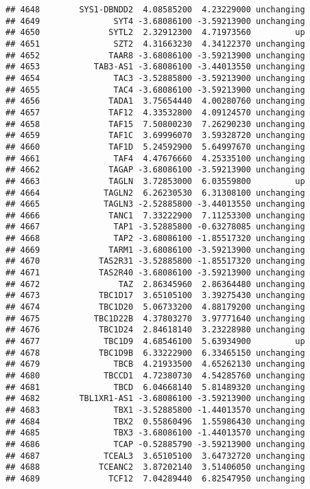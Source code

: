 \documentclass[]{article}
\begin{document}
\begin{verbatim}
## 4648        SYS1-DBNDD2  4.08585200  4.23229000 unchanging
## 4649               SYT4 -3.68086100 -3.59213900 unchanging
## 4650              SYTL2  2.32912300  4.71973560         up
## 4651               SZT2  4.31663230  4.34122370 unchanging
## 4652              TAAR8 -3.68086100 -3.59213900 unchanging
## 4653           TAB3-AS1 -3.68086100 -3.44013550 unchanging
## 4654               TAC3 -3.52885800 -3.59213900 unchanging
## 4655               TAC4 -3.68086100 -3.59213900 unchanging
## 4656              TADA1  3.75654440  4.00280760 unchanging
## 4657              TAF12  4.33532800  4.09124570 unchanging
## 4658              TAF15  7.50800230  7.26290230 unchanging
## 4659              TAF1C  3.69996070  3.59328720 unchanging
## 4660              TAF1D  5.24592900  5.64997670 unchanging
## 4661               TAF4  4.47676660  4.25335100 unchanging
## 4662              TAGAP -3.68086100 -3.59213900 unchanging
## 4663              TAGLN  3.72853000  6.03559800         up
## 4664             TAGLN2  6.26230530  6.31308100 unchanging
## 4665             TAGLN3 -2.52885800 -3.44013550 unchanging
## 4666              TANC1  7.33222900  7.11253300 unchanging
## 4667               TAP1 -3.52885800 -0.63278085 unchanging
## 4668               TAP2 -3.68086100 -1.85517320 unchanging
## 4669              TARM1 -3.68086100 -3.59213900 unchanging
## 4670            TAS2R31 -3.52885800 -1.85517320 unchanging
## 4671            TAS2R40 -3.68086100 -3.59213900 unchanging
## 4672                TAZ  2.86345960  2.86364480 unchanging
## 4673            TBC1D17  3.65105100  3.39275430 unchanging
## 4674            TBC1D20  5.06733200  4.88179200 unchanging
## 4675           TBC1D22B  4.37803270  3.97771640 unchanging
## 4676            TBC1D24  2.84618140  3.23228980 unchanging
## 4677             TBC1D9  4.68546100  5.63934900         up
## 4678            TBC1D9B  6.33222900  6.33465150 unchanging
## 4679               TBCB  4.21933500  4.65262130 unchanging
## 4680             TBCCD1  4.72380730  4.54285760 unchanging
## 4681               TBCD  6.04668140  5.81489320 unchanging
## 4682        TBL1XR1-AS1 -3.68086100 -3.59213900 unchanging
## 4683               TBX1 -3.52885800 -1.44013570 unchanging
## 4684               TBX2  0.55860496  1.55986430 unchanging
## 4685               TBX3 -3.68086100 -1.44013570 unchanging
## 4686               TCAP -0.52885790 -3.59213900 unchanging
## 4687             TCEAL3  3.65105100  3.64732720 unchanging
## 4688            TCEANC2  3.87202140  3.51406050 unchanging
## 4689              TCF12  7.04289440  6.82547950 unchanging

\end{verbatim}
\end{document}
